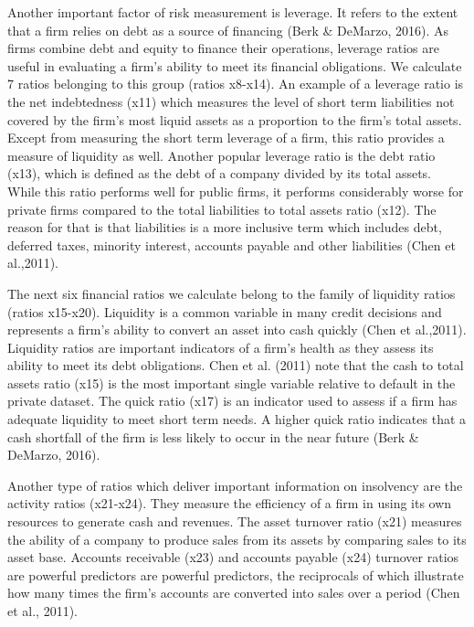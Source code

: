 \documentclass{article}
\begin{document}
 Another important factor of risk measurement is leverage. It refers to the extent that a firm relies on debt as a source of financing (Berk \& DeMarzo, 2016). As firms combine debt and equity to finance their operations, leverage ratios are useful in evaluating a firm's ability to meet its financial obligations. We calculate 7 ratios belonging to this group (ratios x8-x14). An example of a leverage ratio is the net indebtedness (x11) which measures the level of short term liabilities not covered by the firm's most liquid assets as a proportion to the firm's total assets. Except from measuring the short term leverage of a firm, this ratio provides a measure of liquidity as well. Another popular leverage ratio is the debt ratio (x13), which is defined as the debt of a company divided by its total assets. While this ratio performs well for public firms, it performs  considerably worse for private firms compared to the total liabilities to total assets ratio (x12). The reason for that is that liabilities is a more inclusive term which includes debt, deferred taxes, minority interest, accounts payable and other liabilities (Chen et al.,2011).
 
 The next six financial ratios we calculate belong to the family of liquidity ratios (ratios x15-x20). Liquidity is a common variable in many credit decisions and represents a firm's ability to convert an asset into cash quickly (Chen et al.,2011). Liquidity ratios are important indicators of a firm's health as they assess its ability to meet its debt obligations. Chen et al. (2011) note that the cash to total assets ratio (x15) is the most important single variable relative to default in the private dataset. The quick ratio (x17) is an indicator used to assess if a firm has adequate liquidity to meet short term needs. A higher quick ratio indicates that a cash shortfall of the firm is less likely to occur in the near future (Berk \& DeMarzo, 2016). 
 
 Another type of ratios which deliver important information on insolvency are the activity ratios (x21-x24). They measure the efficiency of a firm in using its own resources to generate cash and revenues. The asset turnover ratio (x21) measures the ability of a company to produce sales from its assets by comparing sales to its asset base. Accounts receivable (x23) and accounts payable (x24) turnover ratios are powerful predictors are powerful predictors, the reciprocals of which illustrate how many times the firm's accounts are converted into sales over a period (Chen et al., 2011).  
 
\end{document}

